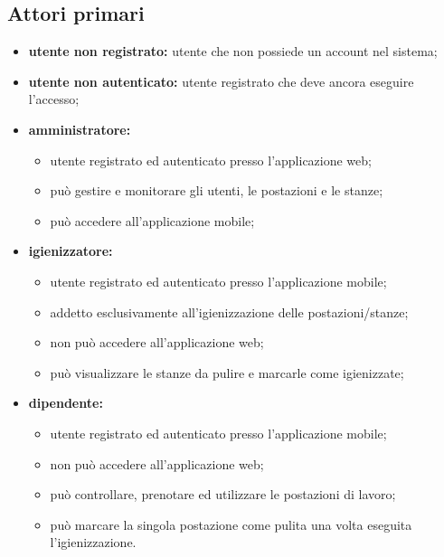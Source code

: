 \subsection{Attori primari}
\begin{itemize}
    \item \textbf{utente non registrato:} utente che non possiede un account nel sistema;
    \item \textbf{utente non autenticato:} utente registrato che deve ancora eseguire l'accesso;

    \item \textbf{amministratore:}
    \begin{itemize}
        \item utente registrato ed autenticato presso l'applicazione web; 
        \item pu\`{o} gestire e monitorare gli utenti, le postazioni e le stanze;
        \item può accedere all'applicazione mobile;
    \end{itemize}

    \item \textbf{igienizzatore:}
    \begin{itemize}
        \item utente registrato ed autenticato presso l'applicazione mobile;
        \item addetto esclusivamente all'igienizzazione delle postazioni/stanze; 
        \item non può accedere all'applicazione web; 
        \item può visualizzare le stanze da pulire e marcarle come igienizzate;
    \end{itemize} 

    \item \textbf{dipendente:}
    \begin{itemize}
        \item utente registrato ed autenticato presso l'applicazione mobile; 
        \item non può accedere all'applicazione web; 
        \item può controllare, prenotare ed utilizzare le postazioni di lavoro;
        \item può marcare la singola postazione come pulita una volta eseguita l'igienizzazione.
    \end{itemize} 
\end{itemize}
